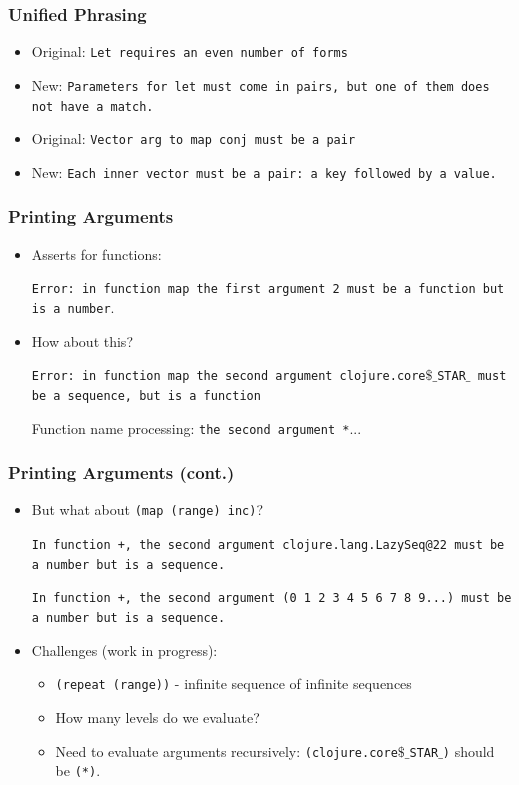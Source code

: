 \documentclass{beamer}
\begin{document}
\begin{frame}
	\frametitle{Unified Phrasing}
	\begin{itemize}
	\item Original: {\tt Let requires an even number of forms}
	\item New: {\tt Parameters for let must come in pairs, but one of them does not have a match.}
	\item Original: {\tt Vector arg to map conj must be a pair}
	\item New: {\tt Each inner vector must be a pair: a key followed by a value.}
	\end{itemize}
\end{frame}

\begin{frame}
	\frametitle{Printing Arguments}
	\begin{itemize}
	\item Asserts for functions: 
	
	{\tt Error: in function map the first argument 2 must be a function but is a number}.
	
	\item How about this?
	
	{\tt Error: in function map the second argument clojure.core$\$\_$STAR$\_$ must be a sequence, but is a function}
	
	Function name processing: {\tt the second argument *}...
	\end{itemize}
\end{frame}

\begin{frame}
	\frametitle{Printing Arguments (cont.)}
	\begin{itemize}
	\item But what about  {\tt (map (range) inc)}? 
	
	{\tt In function +, the second argument clojure.lang.LazySeq@22 must be a number but is a sequence.} 
	
	
	{\tt In function +, the second argument (0 1 2 3 4 5 6 7 8 9...) must be a number but is a sequence.} 
	
	\item Challenges (work in progress):
	\begin{itemize}
	\item {\tt (repeat (range))} - infinite sequence of infinite sequences
	\item How many levels do we evaluate? 
	\item Need to evaluate arguments recursively: {\tt (clojure.core$\$\_$STAR$\_$)} should be {\tt (*)}. 
	\end{itemize}
	\end{itemize}
\end{frame}
\end{document}

